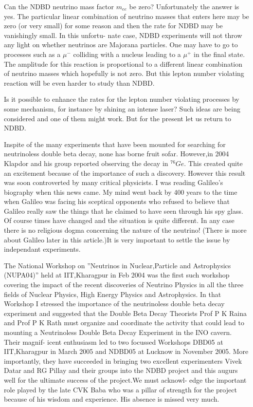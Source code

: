 Can the NDBD neutrino mass factor $m_{ee}$ be zero? Unfortunately the answer is yes. The
particular linear combination of neutrino masses that enters here may be zero (or very small)
for some reason and then the rate for NDBD may be vanishingly small. In this unfortu-
nate case, NDBD experiments will not throw any light on whether neutrinos are Majorana
particles. One may have to go to processes such as a $\mu^{-}$ colliding with a nucleus leading
to a $\mu^{+}$ in the final state. The amplitude for this reaction is proportional to a different
linear combination of neutrino masses which hopefully is not zero. But this lepton number
violating reaction will be even harder to study than NDBD.

Is it possible to enhance the rates for the lepton number violating processes by some
mechanism, for instance by shining an intense laser? Such ideas are being considered and
one of them might work. But for the present let us return to NDBD.

Inspite of the many experiments that have been mounted for searching for neutrinoless double beta decay, none has borne fruit sofar. However,in 2004 Klapdor and his group
reported observing the decay in $^{76}Ge$. This created quite an excitement because of the
importance of such a discovery. However this result was soon controverted by many critical
physicists. I was reading Galileo’s biography when this news came. My mind went back
by 400 years to the time when Galileo was facing his sceptical opponents who refused to
believe that Galileo really saw the things that he claimed to have seen through his spy glass.
Of course times have changed and the situation is quite different. In any case there is no
religious dogma concerning the nature of the neutrino! (There is more about Galileo later
in this article.)It is very important to settle the issue by independant experiments.

The National Workshop on ”Neutrinos in Nuclear,Particle and Astrophysics (NUPA04)”
held at IIT,Kharagpur in Feb 2004 was the first such workshop covering the impact of the
recent discoveries of Neutrino Physics in all the three fields of Nuclear Physics, High Energy
Physics and Astrophysics. In that Workshop I stressed the importance of the neutrinoless
double beta decay experiment and suggested that the Double Beta Decay Theorists Prof P
K Raina and Prof P K Rath must organize and coordinate the activity that could lead to
mounting a Neutrinoless Double Beta Decay Experiment in the INO cavern. Their magnif-
icent enthusiasm led to two focussed Workshops DBD05 at IIT,Kharagpur in March 2005
and NDBD05 at Lucknow in November 2005. More importantly, they have succeeded in
bringing two excellent experimenters Vivek Datar and RG Pillay and their groups into the
NDBD project and this augurs well for the ultimate success of the project.We must acknowl-
edge the important role played by the late CVK Baba who was a pillar of strength for the
project because of his wisdom and experience. His absence is missed very much.

